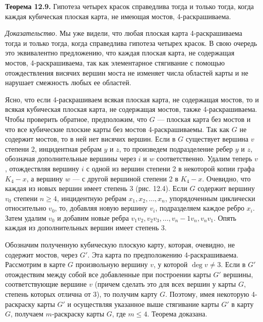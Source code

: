 \textbf{Теорема 12.9.} Гипотеза четырех красок справедлива тогда и только тогда, когда каждая кубическая плоская карта, не имеющая мостов, 4-раскрашиваема.

\textit{Доказательство.} Мы уже видели, что любая плоская карта 4-раскрашиваема тогда и только тогда, когда справедлива гипотеза четырех красок. В свою очередь это эквивалентно предложению, что каждая плоская карта, не содержащая мостов, 4-раскрашиваема, так как элементарное стягивание с помощью отождествления висячих вершин моста не изменяет числа областей карты и не нарушает смежность любых ее областей.

Ясно, что если 4-раскрашиваем всякая плоская карта, не содержащая мостов, то и всякая кубическая плоская карта, не содержащая мостов, также 4-раскрашиваема. Чтобы проверить обратное, предположим, что \( G \) — плоская карта без мостов и что все кубические плоские карты без мостов 4-раскрашиваемы. Так как \( G \) не содержит мостов, то в ней нет висячих вершин. Если в \( G \) существует вершина \( v \) степени 2, инцидентная ребрам \( y \) и \( z \), то произведем подразделение ребер \( y \) и \( z \), обозначая дополнительные вершины через \( i \) и \( w \) соответственно. Удалим теперь \( v \), отождествляя вершину \( i \) с одной из вершин степени 2 в некоторой копии графа \( K_4 - x \), а вершину \( w \) — с другой вершиной степени 2 в \( K_4 - x \). Очевидно, что каждая из новых вершин имеет степень 3 (рис. 12.4). Если \( G \) содержит вершину \( v_0 \) степени \( n \geq 4 \), инцидентную ребрам \( x_1, x_2, \ldots, x_n \), упорядоченным циклически относительно \( v_0 \), то, добавляя новую вершину \( v_i \), подразделяем каждое ребро \( x_i \). Затем удалим \( v_0 \) и добавим новые ребра \( v_1v_2, v_2v_3, \ldots, v_n-1v_n, v_nv_1 \). Опять каждая из дополнительных вершин имеет степень 3.

Обозначим полученную кубическую плоскую карту, которая, очевидно, не содержит мостов, через \( G' \). Эта карта по предположению 4-раскрашиваема. Рассмотрим в карте \( G \) произвольную вершину \( v \), у которой \( \deg v \neq 3 \). Если в \( G' \) отождествим между собой все добавленные при построении карты \( G' \) вершины, соответствующие вершине \( v \) (причем сделать это для всех вершин у карты \( G \), степень которых отлична от 3), то получим карту \( G \). Поэтому, имея некоторую 4-раскраску карты \( G' \) и осуществляя указанное выше стягивание карты \( G' \) в карту \( G \), получаем \( m \)-раскраску карты \( G \), где \( m \leq 4 \). Теорема доказана.